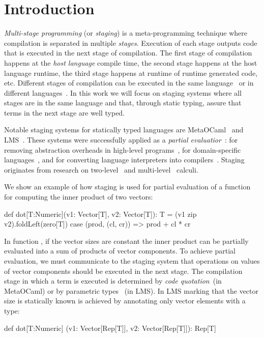 \section{Introduction}
\label{sct:introduction}

 \emph{Multi-stage programming} (or \emph{staging}) is a meta-programming technique
  where compilation is separated in multiple \emph{stages}. Execution of each
  stage outputs code that is executed in the next stage of compilation. The first
  stage of compilation happens at the \emph{host language} compile time, the second
  stage happens at the host language runtime, the third stage happens at runtime of
  runtime generated code, etc. Different stages of compilation can be executed in the same
  language~\cite{taha_multi-stage_1997,nielson2005two} or in different languages~\cite{brown_heterogeneous_2011,devito2013terra}.
  In this work we will focus on staging systems where all stages are in the same language and that, through static typing, assure
  that terms in the next stage are well typed.

  Notable staging systems for statically typed languages are
  MetaOCaml~\cite{taha_multi-stage_1997,calcagno2003implementing}
  and LMS~\cite{rompf2012lightweight}. These systems were successfully applied as a
  \emph{partial evaluatior}~\cite{jones1993partial}: for removing abstraction
  overheads in high-level programs~\cite{carette2005multi,rompf2012lightweight},
  for domain-specific languages~\cite{czarnecki_dsl_2004,jonnalagedda2014staged,taha2004gentle}, and for converting language
  interpreters into compilers~\cite{lancet,futamura1999partial}. Staging originates
  from research on two-level~\cite{nielson2005two,davies1996temporal} and multi-level~\cite{davies1996modal} calculi.

 We show an example of how staging is used for partial evaluation of a function
 for computing the inner product of two vectors\footnotemark[1]:\begin{lstparagraph}
def dot[T:Numeric](v1: Vector[T], v2: Vector[T]): T =
  (v1 zip v2).foldLeft(zero[T]) {
    case (prod, (cl, cr)) => prod + cl * cr
  }
 \end{lstparagraph}

In function , if the vector sizes are constant the inner product can
 be partially evaluated into a sum of products of vector components. To achieve partial evaluation,
 we must communicate to the staging system that operations on values of vector components
 should be executed in the next stage. The compilation stage
 in which a term is executed is determined by \emph{code quotation}~(in MetaOCaml)
 or by parametric types ~(in LMS). In LMS marking
 that the vector size is statically known is achieved by annotating only vector elements with
 a  type\footnotemark[2]:\begin{lstparagraph}
def dot[T:Numeric]
  (v1: Vector[Rep[T]], v2: Vector[Rep[T]]): Rep[T]
 \end{lstparagraph}

